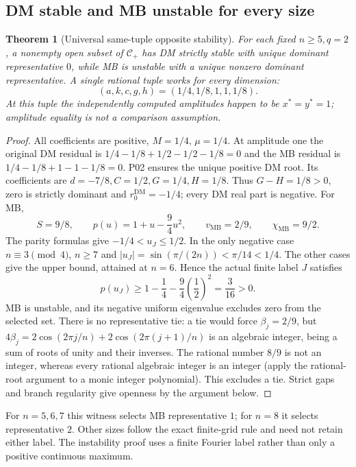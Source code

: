\documentclass[11pt]{article}
\newcommand{\DM}{\mathrm{DM}}
\newcommand{\MB}{\mathrm{MB}}
\newtheorem{theorem}{Theorem}[section]
\theoremstyle{definition}
\theoremstyle{remark}
\begin{document}
\subsection{DM stable and MB unstable for every size}
\begin{theorem}[Universal same-tuple opposite stability]
\label{thm:P08-forward}
For each fixed $n\ge5,q=2$, a nonempty open subset of $\mathcal C_+$
has DM strictly stable with unique dominant representative $0$, while
MB is unstable with a unique nonzero dominant representative. A single
rational tuple works for every dimension:
\begin{equation}
 \boxed{(a,k,c,g,h)=(1/4,1/8,1,1,1/8).}
 \label{eq:P08-forward-witness}
\end{equation}
At this tuple the independently computed amplitudes happen to be
$x^*=y^*=1$; amplitude equality is not a comparison assumption.
\end{theorem}
\begin{proof}
All coefficients are positive, $M=1/4$, $\mu=1/4$. At amplitude one
the original DM residual is $1/4-1/8+1/2-1/2-1/8=0$ and the MB
residual is $1/4-1/8+1-1-1/8=0$. P02 ensures the unique positive DM
root. Its coefficients are $d=-7/8,C=1/2,G=1/4,H=1/8$.
Thus $G-H=1/8>0$, zero is strictly dominant and
$r_0^{\DM}=-1/4$; every DM real part is negative.
For MB,
\[
 S=9/8,\qquad p(u)=1+u-\frac94u^2,\qquad
 v_{\MB}=2/9,\qquad\chi_{\MB}=9/2.
\]
The parity formulas give $-1/4<u_J\le1/2$.
In the only negative case $n\equiv3\pmod4$, $n\ge7$ and
$|u_J|=\sin(\pi/(2n))<\pi/14<1/4$. The other cases give the
upper bound, attained at $n=6$. Hence the actual finite label $J$ satisfies
\[
 p(u_J)\ge1-\frac14-\frac94\left(\frac12\right)^2
 =\frac3{16}>0.
\]
MB is unstable, and its negative uniform eigenvalue excludes zero from
the selected set. There is no representative tie: a tie would force
$\beta_j=2/9$, but
$4\beta_j=2\cos(2\pi j/n)+2\cos(2\pi(j+1)/n)$ is an algebraic
integer, being a sum of roots of unity and their inverses. The rational
number $8/9$ is not an integer, whereas every rational algebraic integer
is an integer (apply the rational-root argument to a monic integer
polynomial). This excludes a tie. Strict gaps and branch regularity
give openness by the argument below.
\end{proof}
For $n=5,6,7$ this witness selects MB representative $1$; for $n=8$
it selects representative $2$. Other sizes follow the exact finite-grid
rule and need not retain either label.
The instability proof uses a finite Fourier label rather than only a
positive continuous maximum.
\end{document}
